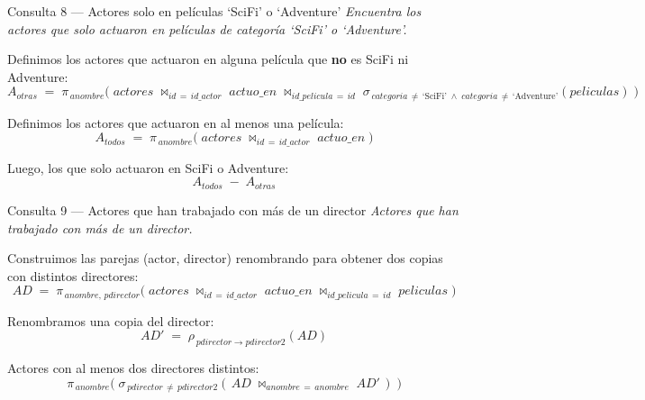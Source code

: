 \documentclass[12pt,a4paper]{article}
\begin{document}
\vspace{0.4cm}

\begin{querybox}{Consulta 8 --- Actores solo en películas `SciFi' o `Adventure'}
\textit{Encuentra los actores que solo actuaron en películas de categoría
\textnormal{`SciFi'} o \textnormal{`Adventure'}.}

Definimos los actores que actuaron en alguna película que \textbf{no} es
SciFi ni Adventure:
\[
  A_{otras} \;=\;
    \pi_{\,anombre}\!\Big(\;
      actores
      \;\bowtie_{id\,=\,id\_actor}\;
      actuo\_en
      \;\bowtie_{id\_pelicula\,=\,id}\;
      \sigma_{\,categoria\,\neq\,\text{`SciFi'}
        \;\wedge\;
        categoria\,\neq\,\text{`Adventure'}}\!(peliculas)
    \;\Big)
\]

Definimos los actores que actuaron en al menos una película:
\[
  A_{todos} \;=\;
    \pi_{\,anombre}\!\Big(\;
      actores
      \;\bowtie_{id\,=\,id\_actor}\;
      actuo\_en
    \;\Big)
\]

Luego, los que solo actuaron en SciFi o Adventure:
\[
  A_{todos} \;-\; A_{otras}
\]
\end{querybox}

\vspace{0.4cm}

\begin{querybox}{Consulta 9 --- Actores que han trabajado con más de un director}
\textit{Actores que han trabajado con más de un director.}

Construimos las parejas (actor, director) renombrando para obtener dos
copias con distintos directores:
\[
  AD \;=\;
    \pi_{\,anombre,\,pdirector}\!\Big(\;
      actores
      \;\bowtie_{id\,=\,id\_actor}\;
      actuo\_en
      \;\bowtie_{id\_pelicula\,=\,id}\;
      peliculas
    \;\Big)
\]

Renombramos una copia del director:
\[
  AD' \;=\;
    \rho_{\,pdirector \to pdirector2}\!(AD)
\]

Actores con al menos dos directores distintos:
\[
  \pi_{\,anombre}\!\Big(\;
    \sigma_{\,pdirector\,\neq\,pdirector2}\!\left(\,
      AD \;\bowtie_{anombre\,=\,anombre}\; AD'
    \,\right)
  \;\Big)
\]
\end{querybox}
\end{document}
